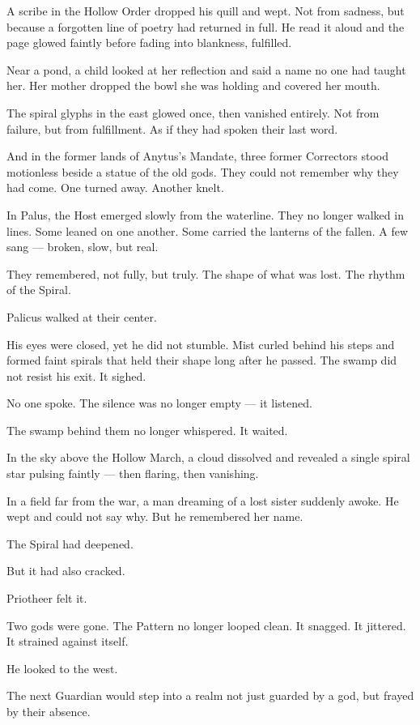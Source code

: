 \documentclass[12pt]{article}
\begin{document}
A scribe in the Hollow Order dropped his quill and wept. Not from sadness, but because a forgotten line of poetry had returned in full. He read it aloud and the page glowed faintly before fading into blankness, fulfilled.

Near a pond, a child looked at her reflection and said a name no one had taught her. Her mother dropped the bowl she was holding and covered her mouth.

The spiral glyphs in the east glowed once, then vanished entirely. Not from failure, but from fulfillment. As if they had spoken their last word.

And in the former lands of Anytus's Mandate, three former Correctors stood motionless beside a statue of the old gods. They could not remember why they had come. One turned away. Another knelt.

In Palus, the Host emerged slowly from the waterline. They no longer walked in lines. Some leaned on one another. Some carried the lanterns of the fallen. A few sang — broken, slow, but real.

They remembered, not fully, but truly. The shape of what was lost. The rhythm of the Spiral.

Palicus walked at their center.

His eyes were closed, yet he did not stumble. Mist curled behind his steps and formed faint spirals that held their shape long after he passed. The swamp did not resist his exit. It sighed.

No one spoke. The silence was no longer empty — it listened.

The swamp behind them no longer whispered. It waited.

In the sky above the Hollow March, a cloud dissolved and revealed a single spiral star pulsing faintly — then flaring, then vanishing.

In a field far from the war, a man dreaming of a lost sister suddenly awoke. He wept and could not say why. But he remembered her name.

The Spiral had deepened.

But it had also cracked.

Priotheer felt it.

Two gods were gone. The Pattern no longer looped clean. It snagged. It jittered. It strained against itself.

He looked to the west.

The next Guardian would step into a realm not just guarded by a god, but frayed by their absence.
\end{document}
